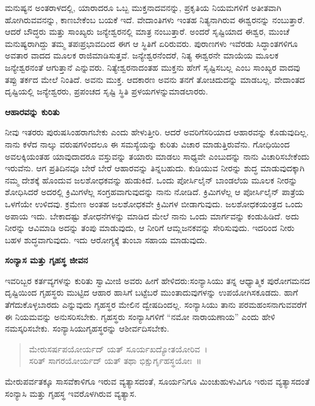 ಮನುಷ್ಯನ ಅಂತರಾಳದಲ್ಲಿ, ಯಾರಾದರೂ ಒಬ್ಬ ಮುಕ್ತನಾದವನನ್ನು, ಪ್ರಕೃತಿಯ ನಿಯಮಗಳಿಗೆ ಅತೀತವಾಗಿ ಹೋಗಿರುವವನನ್ನು, ಕಾಣಬೇಕೆಂಬ ಬಯಕೆ ಇದೆ. ವೇದಾಂತಿಗಳು ಇಂತಹ ನಿತ್ಯನಾಗಿರುವ ಈಶ್ವರನನ್ನು ನಂಬುತ್ತಾರೆ. ಆದರೆ ಬೌದ್ಧರು ಮತ್ತು ಸಾಂಖ್ಯರು ಜನ್ಯೇಶ್ವರನಲ್ಲಿ ಮಾತ್ರ ನಂಬುತ್ತಾರೆ. ಅಂದರೆ ಸೃಷ್ಟಿಯಾದ ಈಶ್ವರ, ಮುಂಚೆ ಮನುಷ್ಯರಾಗಿದ್ದು ತಮ್ಮ ತಪಃಪ್ರಭಾವದಿಂದ ಈಗ ಆ ಸ್ಥಿತಿಗೆ ಏರಿರುವರು. ಪುರಾಣಗಳು ಇವೆರಡು ಸಿದ್ಧಾಂತಗಳಿಗೂ ಅವತಾರ ವಾದದ ಮೂಲಕ ರಾಜಿಮಾಡಿಸುತ್ತವೆ. ಜನ್ಯೇಶ್ವರನೆಂದರೆ, ನಿತ್ಯ ಈಶ್ವರನೇ ಮಾಯೆಯ ಮೂಲಕ ಜನ್ಯೇಶ್ವರನಂತೆ ಆಗುತ್ತಾನೆ ಎನ್ನುವರು. ನಿತ್ಯೇಶ್ವರನಾದಂತಹ ಮುಕ್ತನು ಹೇಗೆ ಸೃಷ್ಟಿಸಬಲ್ಲ ಎಂಬ ಸಾಂಖ್ಯರ ವಾದವು ತಪ್ಪು ತರ್ಕದ ಮೇಲೆ ನಿಂತಿದೆ. ಅವನು ಮುಕ್ತ. ಆದಕಾರಣ ಅವನು ತನಗೆ ತೋಚಿದುದನ್ನು ಮಾಡಬಲ್ಲ. ವೇದಾಂತದ ದೃಷ್ಟಿಯಲ್ಲಿ ಜನ್ಯೇಶ್ವರರು, ಪ್ರಪಂಚದ ಸೃಷ್ಟಿ ಸ್ಥಿತಿ ಪ್ರಳಯಗಳನ್ನು\break ಮಾಡಲಾರರು.

\centerline{\textbf{ಆಹಾರವನ್ನು ಕುರಿತು}}

ನೀವು ಇತರರು ಪುರುಷಸಿಂಹರಾಗಬೇಕು ಎಂದು ಹೇಳುತ್ತೀರಿ. ಆದರೆ ಅವರಿಗೆ\break ಸರಿಯಾದ ಆಹಾರವನ್ನು ಕೊಡುವುದಿಲ್ಲ. ನಾನು ಕಳೆದ ನಾಲ್ಕು ವರುಷಗಳಿಂದಲೂ ಈ ಸಮಸ್ಯೆಯನ್ನು ಕುರಿತು ವಿಚಾರ ಮಾಡುತ್ತಿರುವೆನು. ಗೋಧಿಯಿಂದ ಅವಲಕ್ಕಿಯಂತಹ ಯಾವುದಾದರೂ ವಸ್ತುವನ್ನು ತಯಾರು ಮಾಡಲು ಸಾಧ್ಯವೇ ಎಂಬುದನ್ನು ನಾನು ವಿಚಾರಿಸಬೇಕೆಂದು ಇರುವೆನು. ಆಗ ಪ್ರತಿದಿನವೂ ಬೇರೆ ಬೇರೆ ಆಹಾರವನ್ನು ತಿನ್ನಬಹುದು. ಕುಡಿಯುವ ನೀರನ್ನು ಶುದ್ಧ ಮಾಡುವುದಕ್ಕಾಗಿ ನಮ್ಮ ದೇಶಕ್ಕೆ ಹೊಂದುವ ಜಲಶೋಧಕವನ್ನು ಹುಡುಕಿದೆ. ಒಂದು ಪೋರ್ಸಿಲೈನ್​ ಬಾಂಡಲೆಯ ಮೂಲಕ ನೀರನ್ನು ಶೋಧಿಸಿದರೆ ಅದರಲ್ಲಿ ಕ್ರಿಮಿಗಳೆಲ್ಲ ಸಂಗ್ರಹವಾಗುವುದನ್ನು ನಾನು ನೋಡಿದೆ. ಕ್ರಿಮಿಗಳೆಲ್ಲ ಆ ಪೋರ್ಸಿಲೈನ್​ ಪಾತ್ರೆಯ ಒಳಗೆಯೇ ಉಳಿದವು. ಕ್ರಮೇಣ ಅಂತಹ ಜಲಶೋಧಕವೇ ಕ್ರಿಮಿಗಳ ಬೀಡಾಗುವುದು. ಜಲಶೋಧಕಯಂತ್ರದ ಒಂದು ಅಪಾಯ ಇದು. ಬೇಕಾದಷ್ಟು ಶೋಧನೆಗಳನ್ನು ಮಾಡಿದ ಮೇಲೆ ನಾನು ಒಂದು ಮಾರ್ಗವನ್ನು ಕಂಡುಹಿಡಿದೆ. ಅದು ನೀರನ್ನು ಆವಿಮಾಡಿ ಅದನ್ನು ತಂಪು ಮಾಡುವುದು, ಆ ನೀರಿಗೆ ಆಮ್ಲಜನಕವನ್ನು ಸೇರಿಸುವುದು. ಇದರಿಂದ ನೀರು ಬಹಳ ಶುದ್ಧವಾಗುವುದು. ಇದು ಆರೋಗ್ಯಕ್ಕೆ ತುಂಬಾ ಸಹಾಯ ಮಾಡುವುದು.

\centerline{\textbf{ಸಂನ್ಯಾಸ ಮತ್ತು ಗೃಹಸ್ಥ ಜೀವನ}}

ಇವರಿಬ್ಬರ ಕರ್ತವ್ಯಗಳನ್ನು ಕುರಿತು ಸ್ವಾಮೀಜಿ ಅವರು ಹೀಗೆ ಹೇಳಿದರು:\break ಸಂನ್ಯಾಸಿಯು ತನ್ನ ಆಧ್ಯಾತ್ಮಿಕ ಪುರೋಗಮನದ ದೃಷ್ಟಿಯಿಂದ ಗೃಹಸ್ಥರು ಮುಟ್ಟಿದ ಆಹಾರ ಹಾಸಿಗೆ ಬಟ್ಟೆಬರೆ ಮುಂತಾದುವುಗಳನ್ನು ಉಪಯೋಗಿಸಕೂಡದು. ಹಾಗೆ ತೆಗೆದುಕೊಳ್ಳಬಾರದು ಎನ್ನುವುದು ಗೃಹಸ್ಥರ ಮೇಲಿನ ದ್ವೇಷದಿಂದಲ್ಲ. ಸಂನ್ಯಾಸಿಯು ತಾನು ಪರಮಹಂಸನಾಗುವವರೆಗೆ ಈ ನಿಯಮವನ್ನು ಅನುಸರಿಸಬೇಕು. ಗೃಹಸ್ಥರು ಸಂನ್ಯಾಸಿಗಳಿಗೆ “ನಮೋ ನಾರಾಯಣಾಯ” ಎಂದು ಹೇಳಿ ನಮಸ್ಕರಿಸಬೇಕು. ಸಂನ್ಯಾಸಿಯು\break ಗೃಹಸ್ಥರನ್ನು ಆಶೀರ್ವದಿಸಬೇಕು.

\begin{verse}
 ಮೇರುಸರ್ಷಪಯೋರ್ಯದ್​ ಯತ್​ ಸೂರ್ಯಖದ್ಯೋತಯೋರಿವ~।\\
 ಸರಿತ್​ ಸಾಗರಯೋರ್ಯದ್​ ಯತ್​ ತಥಾ ಭಿಕ್ಷುರ್ಗೃಹಸ್ಥಯೋಃ~॥
\end{verse}

ಮೇರುಪರ್ವತಕ್ಕೂ ಸಾಸವೆಕಾಳಿಗೂ ಇರುವ ವ್ಯತ್ಯಾಸದಂತೆ, ಸೂರ್ಯನಿಗೂ ಮಿಂಚುಹುಳುವಿಗೂ ಇರುವ ವ್ಯತ್ಯಾಸದಂತೆ ಸಂನ್ಯಾಸಿ ಮತ್ತು ಗೃಹಸ್ಥ ಇವರೊಳಗಿರುವ ವ್ಯತ್ಯಾಸ.

